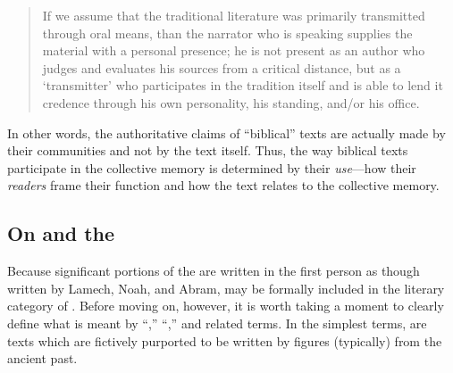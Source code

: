 \begin{quote}
If we assume that the traditional literature was primarily transmitted through oral means, than the narrator who is speaking supplies the material with a personal presence; he is not present as an author who judges and evaluates his sources from a critical distance, but as a `transmitter' who participates in the tradition itself and is able to lend it credence through his own personality, his standing, and/or his office.\autocite[33]{blum_barton-etal2007}
\end{quote}

In other words, the authoritative claims of ``biblical'' texts are actually made by their communities and not by the text itself. Thus, the way biblical texts participate in the collective memory is determined by their \emph{use}---how their \emph{readers} frame their function and how the text relates to the collective memory. 

\subsection{On \Psy and the \Psa}

Because significant portions of the \ga are written in the first person as though written by Lamech, Noah, and Abram, \ga may be formally included in the literary category of \psy. Before moving on, however, it is worth taking a moment to clearly define what is meant by ``\psy,'' ``\psa,'' and related terms.\autocites[The topic of \psy has received a large amount of very sophisticated attention in recent years. See especially][]{mroczek2016}{tigchelaar_tigchelaar2014}{reed_towsend-moulie2011}{reed_jts2009}{reed_ditomasso-turcescu2008}{najman_hilhorst-puech2007}{najman2003} In the simplest terms, \psa are texts which are fictively purported to be written by figures (typically) from the ancient past. 


